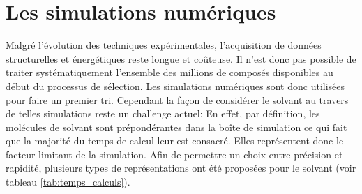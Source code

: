 \section{Les simulations numériques}
Malgré l'évolution des techniques expérimentales, l'acquisition de données structurelles et énergétiques reste longue et coûteuse. Il n'est donc pas possible de traiter systématiquement l'ensemble des millions de composés disponibles au début du processus de sélection. Les simulations numériques sont donc utilisées pour faire un premier tri. Cependant la façon de considérer le solvant au travers de telles simulations reste un challenge actuel: En effet, par définition, les molécules de solvant sont prépondérantes dans la boîte de simulation ce qui fait que la majorité du temps de calcul leur est consacré. Elles représentent donc le facteur limitant de la simulation. Afin de permettre un choix entre précision et rapidité, plusieurs types de représentations ont été proposées pour le solvant\cite{Skyner_review_2015, Reddy_free_2014, brown_free_2010} (voir tableau \ref{tab:temps_calculs}).


